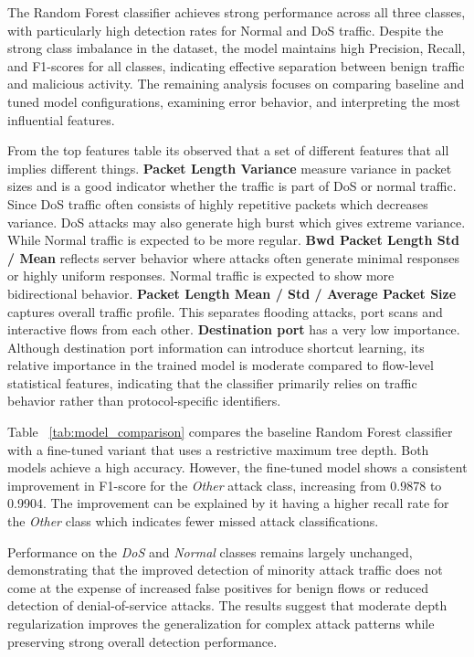 \documentclass[conference]{IEEEtran}
\begin{document}
The Random Forest classifier achieves strong performance across all three classes, with particularly high detection rates for Normal and DoS traffic. Despite the strong class imbalance in the dataset, the model maintains high Precision, Recall, and F1-scores for all classes, indicating effective separation between benign traffic and malicious activity. The remaining analysis focuses on comparing baseline and tuned model configurations, examining error behavior, and interpreting the most influential features.

From the top features table its observed that a set of different features that all implies different things.
\textbf{Packet Length Variance} measure variance in packet sizes and is a good indicator whether the traffic is part of DoS or normal traffic. Since DoS traffic often consists of highly repetitive packets which decreases variance. DoS attacks may also generate high burst which gives extreme variance. While Normal traffic is expected to be more regular.
\textbf{Bwd Packet Length Std / Mean} reflects server behavior where attacks often generate minimal responses or highly uniform responses. Normal traffic is expected to show more bidirectional behavior.
\textbf{Packet Length Mean / Std / Average Packet Size} captures overall traffic profile. This separates flooding attacks, port scans and interactive flows from each other. 
\textbf{Destination port} has a very low importance. Although destination port information can introduce shortcut learning, its relative importance in the trained model is moderate compared to flow-level statistical features, indicating that the classifier primarily relies on traffic behavior rather than protocol-specific identifiers.

Table ~\ref{tab:model_comparison} compares the baseline Random Forest classifier with a fine-tuned variant that uses a restrictive maximum tree depth. Both models achieve a high accuracy. However, the fine-tuned model shows a consistent improvement in F1-score for the \textit{Other} attack class, increasing from 0.9878 to 0.9904. The improvement can be explained by it having a higher recall rate for the \textit{Other} class which indicates fewer missed attack classifications. 

Performance on the \textit{DoS} and \textit{Normal} classes remains largely unchanged, demonstrating that the improved detection of minority attack traffic does not come at the expense of increased false positives for benign flows or reduced detection of denial-of-service attacks. The results suggest that moderate depth regularization improves the generalization for complex attack patterns while preserving strong overall detection performance. 
\end{document}
